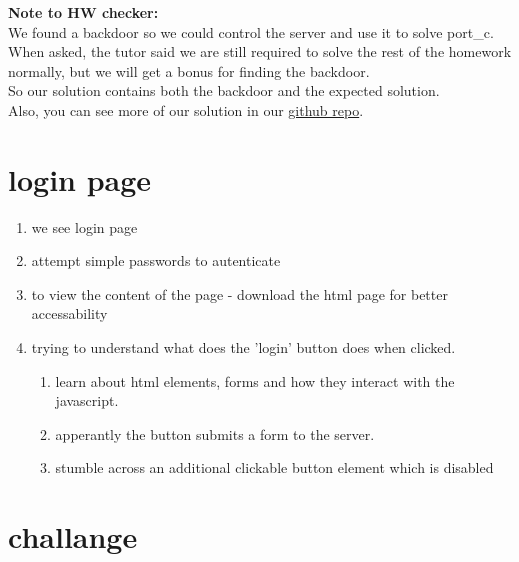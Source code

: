 \documentclass{article}
\begin{document}
\author{Yosef Goren \& Tomer Bitan}
\title{}
\maketitle

\textbf{Note to HW checker:}\\
We found a backdoor so we could control the server
and use it to solve port\_c.\\
When asked, the tutor said
we are still required to solve the rest of the homework normally, but we will get a bonus
for finding the backdoor.\\
So our solution contains both the backdoor and the expected solution.\\

Also, you can see more of our solution in our \href{https://github.com/yosefgoren/Reverse-Engineering-236496}{github repo}.


\tableofcontents

\section{login page}
\begin{enumerate}
	\item we see login page
	\item attempt simple passwords to autenticate
	\item to view the content of the page - download the html page for better accessability
    \item trying to understand what does the 'login' button does when clicked.
    \begin{enumerate}
        \item learn about html elements, forms and how they interact with the javascript.
        \item apperantly the button submits a form to the server.
        \item stumble across an additional clickable button element which is disabled
    \end{enumerate}
\end{enumerate}

\section{challange}
\end{document}
